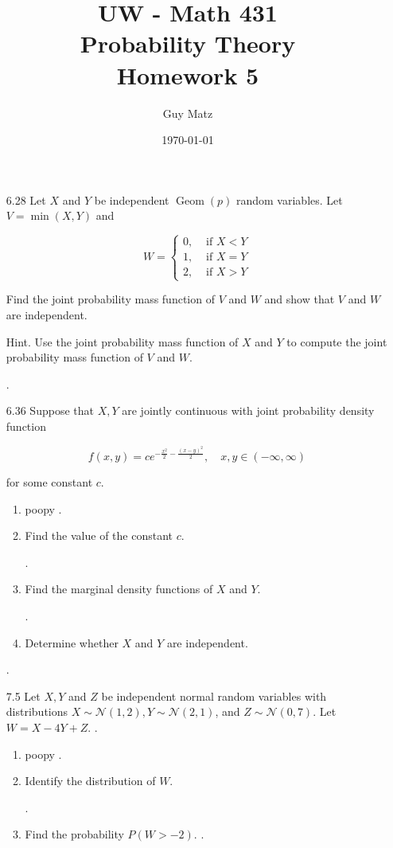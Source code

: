 \documentclass[10pt]{article}
\title{UW - Math 431 \\
Probability Theory \\
Homework 5}
\author{Guy Matz}
\date{\today}
\begin{document}
\maketitle

\begin{itemize}
 .  \item[6.28] Let $X$ and $Y$ be independent $\operatorname{Geom}(p)$ random variables. Let $V=\min (X, Y)$ and

\[
W= \begin{cases}0, & \text { if } X<Y \\ 1, & \text { if } X=Y \\ 2, & \text { if } X>Y\end{cases}
\]

Find the joint probability mass function of $V$ and $W$ and show that $V$ and $W$ are independent.

Hint. Use the joint probability mass function of $X$ and $Y$ to compute the joint probability mass function of $V$ and $W$.


\newpage
 . \item[6.36] Suppose that $X, Y$ are jointly continuous with joint probability density function

$$
f(x, y)=c e^{-\frac{x^{2}}{2}-\frac{(x-y)^{2}}{2}}, \quad x, y \in(-\infty, \infty)
$$

for some constant $c$.

    \begin{enumerate}
 .    .\item poopy
 .     \item Find the value of the constant $c$.

 .     \item Find the marginal density functions of $X$ and $Y$.

 .     \item Determine whether $X$ and $Y$ are independent.
    \end{enumerate}

\newpage
 . \item[7.5] Let $X, Y$ and $Z$ be independent normal random variables with distributions $X \sim \mathcal{N}(1,2), Y \sim \mathcal{N}(2,1)$, and $Z \sim \mathcal{N}(0,7)$. Let $W=X-4 Y+Z$.
 .   \begin{enumerate}
 .    .\item poopy
 .     \item Identify the distribution of $W$.

 .     \item Find the probability $P(W>-2)$.
 .   \end{enumerate}


\end{itemize}
\end{document}
